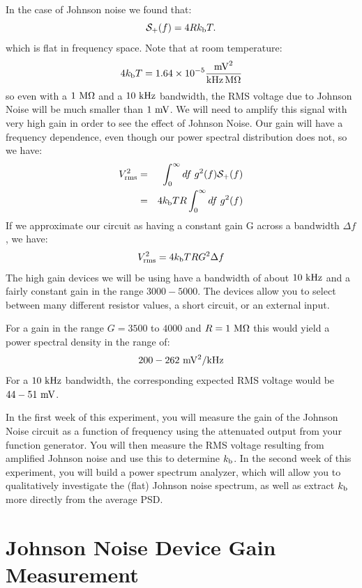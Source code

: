 \documentclass[12pt]{article}
\newcommand{\kb}{k_{\rm b}}
\begin{document}
In the case of Johnson noise we found that:
\begin{equation}
\mathcal{S}_{+}(f) = 4 R \kb T.
\end{equation}
which is flat in frequency space.  Note that at room temperature:
\begin{displaymath}
4 \kb T =  1.64 \times 10^{-5} \frac{{\rm mV}^2}{\rm kHz \, M\Omega}
\end{displaymath}
so even with a $1~\rm M\Omega$ and a $10~\rm kHz$ bandwidth, the RMS voltage due to Johnson Noise will be much smaller than $1~\rm mV$.  We will need to amplify this signal with very high gain in order to see the effect of Johnson Noise.  Our gain will have a frequency dependence, even though our power spectral distribution does not, so we have:
\begin{eqnarray*}
V_{\rm rms}^2  &=& \int_{0}^{\infty} df \; g^2(f) \mathcal{S}_+(f)\\
&=& 4 \kb T R \int_{0}^{\infty} df \; g^2(f)
\end{eqnarray*}
If we approximate our circuit as having a constant gain G across a bandwidth $\Delta f$, we have:
\begin{displaymath}
V_{\rm rms}^2  = 4 \kb T R G^2 \Delta f
\end{displaymath}
The high gain devices we will be using have a bandwidth of about $10~\rm kHz$ and a fairly constant gain in the range $3000-5000$.   The devices allow you to select between many different resistor values, a short circuit, or an external input. 

For a gain in the range $G=3500$ to $4000$ and $R=1~\rm M\Omega$ this would yield a power spectral density in the range of:
\begin{displaymath}
200-262~\rm mV^2/kHz
\end{displaymath}
For a $10~\rm kHz$ bandwidth, the corresponding expected RMS voltage would be $44-51~\rm mV$.

In the first week of this experiment, you will measure the gain of the Johnson Noise circuit as a function of frequency using the attenuated output from your function generator.  You will then measure the RMS voltage resulting from amplified Johnson noise and use this to determine $\kb$.  In the second week of this experiment, you will build a power spectrum analyzer, which will allow you to qualitatively investigate the (flat) Johnson noise spectrum, as well as extract $\kb$ more directly from the average PSD.

\section{Johnson Noise Device Gain Measurement}
\end{document}
